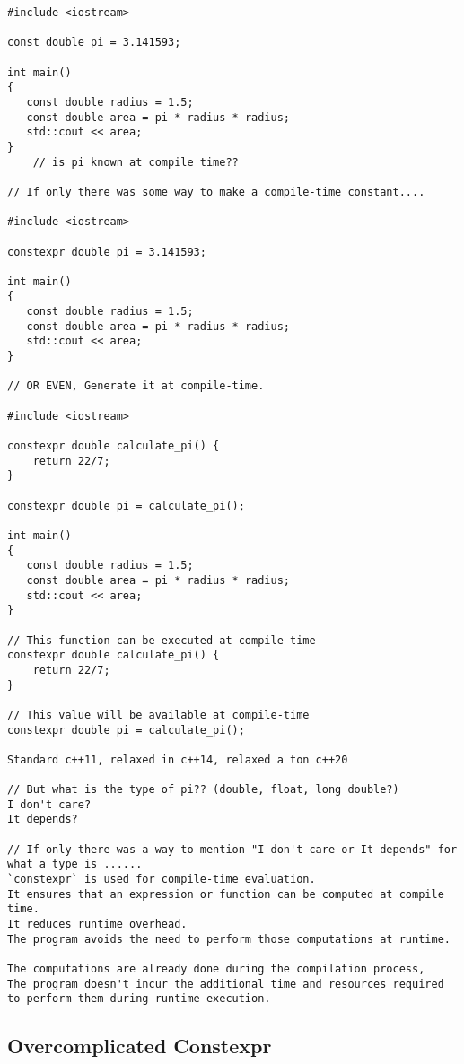 \documentclass[openany]{report}
\begin{document}
\begin{verbatim}
#include <iostream>

const double pi = 3.141593;

int main()
{
   const double radius = 1.5;
   const double area = pi * radius * radius;
   std::cout << area;
}
    // is pi known at compile time??

// If only there was some way to make a compile-time constant....

#include <iostream>

constexpr double pi = 3.141593;

int main()
{
   const double radius = 1.5;
   const double area = pi * radius * radius;
   std::cout << area;
}

// OR EVEN, Generate it at compile-time.

#include <iostream>

constexpr double calculate_pi() {
    return 22/7;
}

constexpr double pi = calculate_pi();

int main()
{
   const double radius = 1.5;
   const double area = pi * radius * radius;
   std::cout << area;
}

// This function can be executed at compile-time
constexpr double calculate_pi() {
    return 22/7;
}

// This value will be available at compile-time 
constexpr double pi = calculate_pi();

Standard c++11, relaxed in c++14, relaxed a ton c++20

// But what is the type of pi?? (double, float, long double?)
I don't care?
It depends?

// If only there was a way to mention "I don't care or It depends" for what a type is ......  
`constexpr` is used for compile-time evaluation.
It ensures that an expression or function can be computed at compile time.
It reduces runtime overhead.
The program avoids the need to perform those computations at runtime. 

The computations are already done during the compilation process, 
The program doesn't incur the additional time and resources required
to perform them during runtime execution.
\end{verbatim}

\subsection{Overcomplicated Constexpr}
\end{document}
